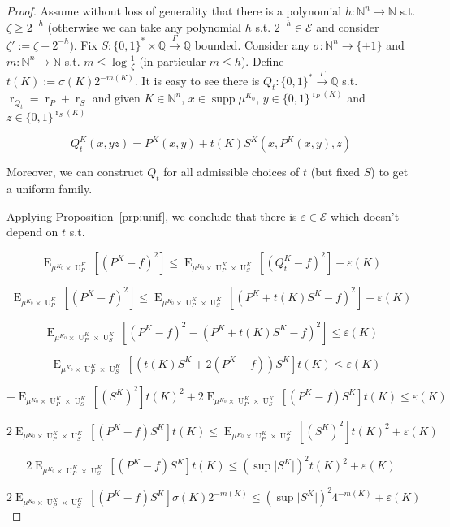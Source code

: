 \documentclass{article}
\numberwithin{equation}{section}
\theoremstyle{definition}
\theoremstyle{plain}
\newcommand{\Bool}{\{0,1\}}
\newcommand{\Words}{{\Bool^*}}
\newcommand{\WordsLen}[1]{{\Bool^{#1}}}
\DeclareMathOperator{\Supp}{supp}
\DeclareMathOperator{\E}{E}
\DeclareMathOperator{\R}{r}
\DeclareMathOperator{\Un}{U}
\newcommand{\Nats}{\mathbb{N}}
\newcommand{\Rats}{\mathbb{Q}}
\newcommand{\Abs}[1]{\lvert #1 \rvert}
\newcommand{\Fall}{\mathcal{E}}
\newcommand{\Scheme}{\xrightarrow{\Gamma}}
\begin{document}
\begin{proof}

Assume without loss of generality that there is a polynomial ${h: \Nats^n \rightarrow \Nats}$ s.t. $\zeta \geq 2^{-h}$ (otherwise we can take any polynomial $h$ s.t. $2^{-h} \in \Fall$ and consider $\zeta':=\zeta+2^{-h}$). Fix $S: \Words \times \Rats \Scheme \Rats$ bounded. Consider any ${\sigma: \Nats^n \rightarrow \{ \pm 1 \}}$ and $m: \Nats^n \rightarrow \Nats$ s.t. $m \leq \log \frac{1}{\zeta}$ (in particular ${m \leq h}$). Define ${t(K) := \sigma(K) 2^{-m(K)}}$. It is easy to see there is ${Q_t: \Words \Scheme \Rats}$ s.t. ${\R_{Q_t}=\R_P+\R_S}$ and given $K \in \Nats^n$, $x \in \Supp \mu^{K_0}$, ${y \in \WordsLen{\R_P(K)}}$ and ${z \in \WordsLen{ \R_S(K)}}$

$$Q_t^{K}(x,yz) = P^{K}(x,y) + t(K) S^{K}(x,P^{K}(x,y),z)$$

Moreover, we can construct $Q_t$ for all admissible choices of $t$ (but fixed $S$) to get a uniform family.

Applying Proposition~\ref{prp:unif}, we conclude that there is $\varepsilon \in \Fall$ which doesn't depend on $t$ s.t.

$$\E_{\mu^{K_0} \times \Un_P^{K}}[(P^{K} - f)^2] \leq \E_{\mu^{K_0} \times \Un_P^{K} \times \Un_S^{K}}[(Q_t^{K} - f)^2] + \varepsilon(K)$$

$$\E_{\mu^{K_0} \times \Un_P^{K}}[(P^{K} - f)^2] \leq \E_{\mu^{K_0} \times \Un_P^{K} \times \Un_S^{K}}[(P^{K} + t(K)S^{K}  - f)^2] + \varepsilon(K)$$

$$\E_{\mu^{K_0} \times \Un_P^{K} \times \Un_S^{K}}[(P^{K} - f)^2 - (P^{K} + t(K)S^{K} - f)^2] \leq \varepsilon(K)$$

$$-\E_{\mu^{K_0} \times \Un_P^{K} \times \Un_S^{K}}[(t(K)S^{K} + 2 (P^{K} - f)) S^{K}] t(K) \leq \varepsilon(K)$$

$$-\E_{\mu^{K_0} \times \Un_P^{K} \times \Un_S^{K}}[(S^{K})^2] t(K)^2 + 2 \E_{\mu^{K_0} \times \Un_P^{K} \times \Un_S^{K}}[(P^{K} - f) S^{K}] t(K) \leq \varepsilon(K)$$

$$2 \E_{\mu^{K_0} \times \Un_P^{K} \times \Un_S^{K}}[(P^{K} - f) S^{K}] t(K) \leq \E_{\mu^{K_0} \times \Un_P^{K} \times \Un_S^{K}}[(S^{K})^2] t(K)^2 + \varepsilon(K)$$

$$2 \E_{\mu^{K_0} \times \Un_P^{K} \times \Un_S^{K}}[(P^{K} - f) S^{K}] t(K) \leq (\sup \Abs{S^{K}})^2 t(K)^2 + \varepsilon(K)$$

$$2 \E_{\mu^{K_0} \times \Un_P^{K} \times \Un_S^{K}}[(P^{K} - f) S^{K}] \sigma(K) 2^{-m(K)} \leq (\sup \Abs{S^{K}})^2 4^{-m(K)} + \varepsilon(K)$$


\end{proof}
\end{document}
